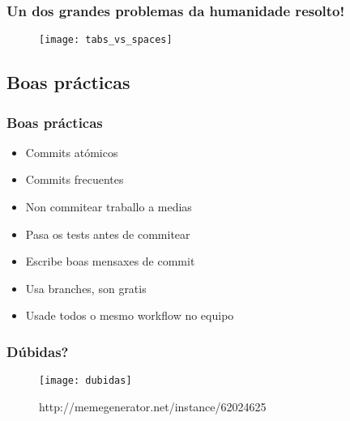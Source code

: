 \begin{frame}
  \frametitle{Un dos grandes problemas da humanidade resolto!}
  \begin{figure}[ht]
    \centering
    \texttt{[image: tabs\_vs\_spaces]}
  \end{figure}
\end{frame}

\subsection{Boas prácticas}
\label{subsec:BoasPracticas}

\begin{frame}
  \frametitle{Boas prácticas}
  \begin{itemize}
    \item Commits atómicos
    \item Commits frecuentes
    \item Non commitear traballo a medias
    \item Pasa os tests antes de commitear
    \item Escribe boas mensaxes de commit
    \item Usa branches, son gratis
    \item Usade todos o mesmo workflow no equipo
  \end{itemize}
\end{frame}

\begin{frame}
  \frametitle{Dúbidas?}
  \begin{figure}[ht]
    \centering
    \texttt{[image: dubidas]}
    \caption{http://memegenerator.net/instance/62024625}
  \end{figure}
\end{frame}

